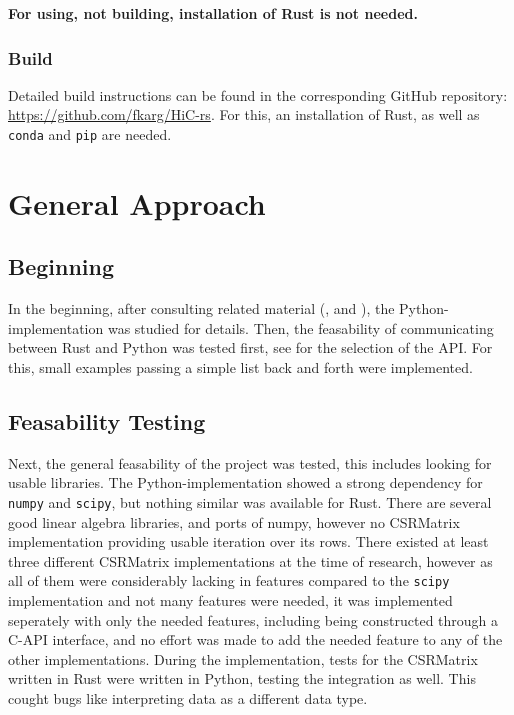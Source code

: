 \textbf{For using, not building, installation of Rust is not needed.}


\subsubsection{Build}\label{sec:build}

Detailed build instructions can be found in the corresponding GitHub
repository: \url{https://github.com/fkarg/HiC-rs}. For this, an installation of
Rust, as well as \verb|conda| and \verb|pip| are needed.


\section{General Approach}\label{sec:approach}


\subsection{Beginning}

In the beginning, after consulting related material
(\cite{imakaev2012iterative}, \cite{lieberman2009comprehensive} and
\cite{wingett2015hicup}), the Python-implementation was studied for details.
Then, the feasability of communicating between Rust and Python was tested
first, see  for the selection of the API. For this, small
examples passing a simple list back and forth were implemented.

\subsection{Feasability Testing}

Next, the general feasability of the project was tested, this includes looking
for usable libraries. The Python-implementation showed a strong dependency for
\verb|numpy| and \verb|scipy|, but nothing similar was available for Rust.
There are several good linear algebra libraries, and ports of numpy, however no
CSRMatrix implementation providing usable iteration over its rows. There
existed at least three different CSRMatrix implementations at the time of
research, however as all of them were considerably lacking in features compared
to the \verb|scipy| implementation and not many features were needed, it was
implemented seperately with only the needed features, including being
constructed through a C-API interface, and no effort was made to add the needed
feature to any of the other implementations. During the implementation, tests
for the CSRMatrix written in Rust were written in Python, testing the
integration as well. This cought bugs like interpreting data as a different
data type.


